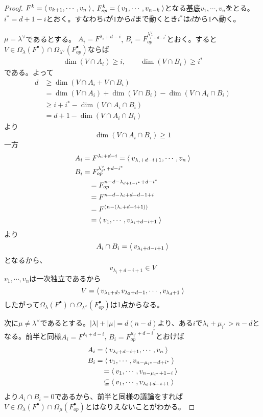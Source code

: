 \documentclass{ltjsreport}
\begin{document}
\begin{proof}
  $F^k=\langle\:v_{k+1},\cdots,v_n\:\rangle$, $F^k_{op}=\langle\:v_1,\cdots,v_{n-k}\:\rangle$となる基底$v_1,\cdots,v_n$をとる。$i^*=d+1-i$とおく。すなわち$i$が$1$から$d$まで動くとき$i^*$は$d$から$1$へ動く。
  
  $\mu=\lambda^\vee$であるとする。
  $A_i=F^{\lambda_i+d-i}$, $B_i=F_{op}^{\lambda^\vee_{i^*+d-i^*}}$とおく。すると$V\in\Omega_{\lambda}(F^\bullet)\cap \Omega_{\lambda^{\vee}}(F^\bullet_{op})$ならば
  \begin{align*}
    \dim(V\cap A_i)\geq i,\qquad \dim(V\cap B_i)\geq i^*
  \end{align*}
  である。よって
  \begin{align*}
    d
    &\geq \dim (V\cap A_i+V\cap B_i)\\
    &=\dim(V\cap A_i)+\dim(V\cap B_i)-\dim(V\cap A_i\cap B_i)\\
    &\geq i+i^*-\dim(V\cap A_i\cap B_i)\\
    &=d+1-\dim(V\cap A_i\cap B_i)
  \end{align*}
  より
  \[
    \dim(V\cap A_i\cap B_i)\geq 1  
  \]
  一方
  \begin{align*}
    &A_i=F^{\lambda_i+d-i}=\langle\:v_{\lambda_i+d-i+1},\cdots,v_n\:\rangle\\
    &B_i=F^{\lambda^\vee_{i^*}+d-i^*}_{op}\\
    &\qquad=F^{n-d-\lambda_{d+1-i^*}+d-i^*}_{op}\\
    &\qquad=F^{n-d-\lambda_{i}+d-d-1+i}\\
    &\qquad=F^{(n-(\lambda_i+d-i+1))}\\
    &\qquad=\langle\:v_1,\cdots,v_{\lambda_i+d-i+1}\:\rangle
  \end{align*}
  より
  \[
  A_i\cap B_i=\langle\:v_{\lambda_i+d-i+1}\:\rangle  
  \]
  となるから、
  \[
    v_{\lambda_i+d-i+1}\in V    
  \]
  $v_1,\cdots,v_n$は一次独立であるから
  \[
  V=\langle\:v_{\lambda_1+d},v_{\lambda_2+d-1},\cdots,v_{\lambda_d+1}\:\rangle  
  \]
  したがって$\Omega_{\lambda}(F^\bullet)\cap\Omega_{\lambda^\vee}(F^\bullet_{op})$は1点からなる。

  次に$\mu\neq\lambda^\vee$であるとする。$|\lambda|+|\mu|=d(n-d)$より、ある$i$で$\lambda_i+\mu_{i^*}> n-d$となる。前半と同様$A_i=F^{\lambda_i+d-i}$, $B_i=F^{\mu_{i^*}+d-i^*}_{op}$とおけば
  \begin{align*}
    &A_i=\langle\:v_{\lambda_i+d-i+1},\cdots,v_n\:\rangle\\
    &B_i=\langle\:v_1,\cdots,v_{n-\mu_{i^*}-d+i^*}\:\rangle\\
    &\qquad =\langle\:v_1,\cdots,v_{n-\mu_{i^*}+1-i}\:\rangle\\
    &\qquad \subsetneq\langle\:v_1,\cdots,v_{\lambda_i+d-i+1}\:\rangle
  \end{align*}
  より$A_i\cap B_i=0$であるから、前半と同様の議論をすれば$V\in\Omega_{\lambda}(F^\bullet)\cap\Omega_{\mu}(F^\bullet_{op})$とはなりえないことがわかる。
\end{proof}
\end{document}
